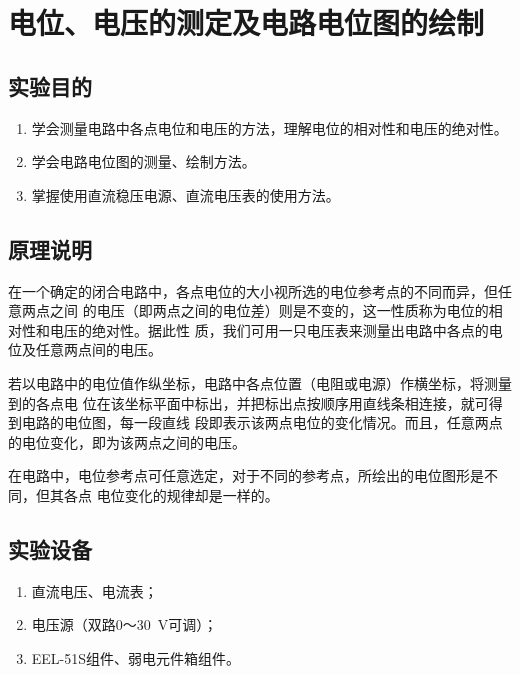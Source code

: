 \documentclass[UTF8]{article}
\begin{document}
    \section{电位、电压的测定及电路电位图的绘制}
        \subsection{实验目的}
            \begin{enumerate}[label=\textbf{\arabic*}.]
                \item 学会测量电路中各点电位和电压的方法，理解电位的相对性和电压的绝对性。
                \item 学会电路电位图的测量、绘制方法。
                \item 掌握使用直流稳压电源、直流电压表的使用方法。
            \end{enumerate}
        \subsection{原理说明}
            \noindent\hspace{2em}在一个确定的闭合电路中，各点电位的大小视所选的电位参考点的不同而异，但任意两点之间
            的电压（即两点之间的电位差）则是不变的，这一性质称为电位的相对性和电压的绝对性。据此性
            质，我们可用一只电压表来测量出电路中各点的电位及任意两点间的电压。 
            \par
            \noindent\hspace{2em}若以电路中的电位值作纵坐标，电路中各点位置（电阻或电源）作横坐标，将测量到的各点电
            位在该坐标平面中标出，并把标出点按顺序用直线条相连接，就可得到电路的电位图，每一段直线
            段即表示该两点电位的变化情况。而且，任意两点的电位变化，即为该两点之间的电压。
            \par
            \noindent\hspace{2em}在电路中，电位参考点可任意选定，对于不同的参考点，所绘出的电位图形是不同，但其各点
            电位变化的规律却是一样的。 
        \subsection{实验设备}
            \begin{enumerate}[label=\textbf{\arabic*}.]
                \item 直流电压、电流表； 
                \item 电压源（双路0～\SI{30}{V}可调）；
                \item EEL-51S组件、弱电元件箱组件。
            \end{enumerate}
\end{document}
